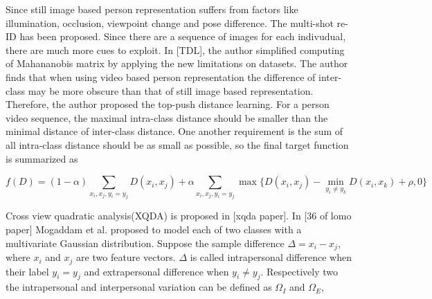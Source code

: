 Since still image based person representation suffers from factors like illumination, occlusion, viewpoint change and pose difference. The multi-shot re-ID has been proposed. Since there are a sequence of images for each indivudual, there are much more cues to exploit.
In [TDL], the author simplified computing of Mahananobis matrix by applying the new limitations on datasets. The author finds that when using video based person representation the difference of inter-class may be more obscure than that of still image based representation. Therefore, the author proposed the top-push distance learning. For a person video sequence, the maximal intra-class distance should be smaller than the minimal distance of inter-class distance. One another requirement is the sum of all intra-class distance should be as small as possible, so the final target function is summarized as 

\begin{equation}
f(D) = (1-\alpha)\sum_{x_i,x_j,y_i=y_j} D(x_i,x_j) +  \alpha \sum_{x_i,x_j,y_i=y_j}\max\{{D(x_i,x_j)-\min_{y_i\ne y_k}{D(x_i,x_k)}+\rho,0}\}
\end{equation}

Cross view quadratic analysis(XQDA) is proposed in [xqda paper]. In [36 of lomo paper] Mogaddam et al. proposed to model each of two classes with a multivariate Gaussian  distribution. Suppose the sample difference $\Delta = x_i - x_j$, where $x_i$ and $x_j$ are two feature vectors. $\Delta$ is called intrapersonal difference when their label $y_i = y_j$ and extrapersonal difference when $y_i \ne y_j$. Respectively two the intrapersonal and interpersonal variation can be defined as $\Omega_I$ and $\Omega_E$,


